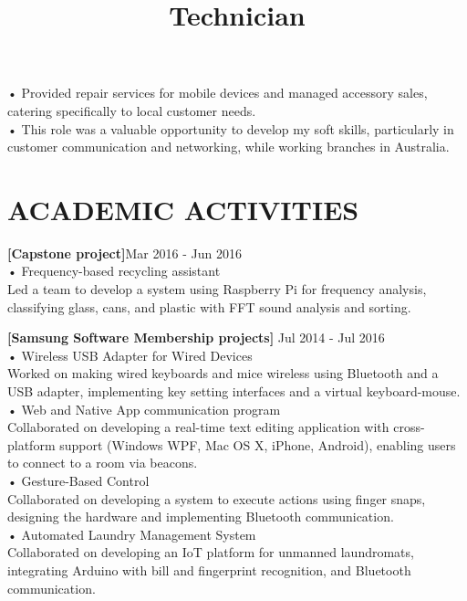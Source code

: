 \documentclass[margin]{res}
\begin{document}
\begin{resume}
    \title{Technician}
    \begin{position}
        • Provided repair services for mobile devices and managed accessory sales, catering specifically to local customer needs.
        \\• This role was a valuable opportunity to develop my soft skills, particularly in customer communication and networking, while working
branches in Australia.
    \end{position}
    

\section{ACADEMIC ACTIVITIES}
\par
\textbf{[Capstone project]}\hfill Mar 2016 - Jun 2016\\
• Frequency-based recycling assistant\\
Led a team to develop a system using Raspberry Pi for frequency analysis, classifying glass, cans, and plastic with FFT sound analysis and sorting.
\par
\textbf{[Samsung Software Membership projects]} \hfill Jul 2014 - Jul 2016\\
• Wireless USB Adapter for Wired Devices\\%
Worked on making wired keyboards and mice wireless using Bluetooth and a USB adapter, implementing key setting interfaces and a virtual keyboard-mouse.\\
• Web and Native App communication program\\%
Collaborated on developing a real-time text editing application with cross-platform support (Windows WPF, Mac OS X, iPhone, Android), enabling users to connect to a room via beacons.\\
• Gesture-Based Control\\%
Collaborated on developing a system to execute actions using finger snaps, designing the hardware and implementing Bluetooth communication.\\
• Automated Laundry Management System\\%
Collaborated on developing an IoT platform for unmanned laundromats, integrating Arduino with bill and fingerprint recognition, and Bluetooth communication.


\end{resume}
\end{document}
